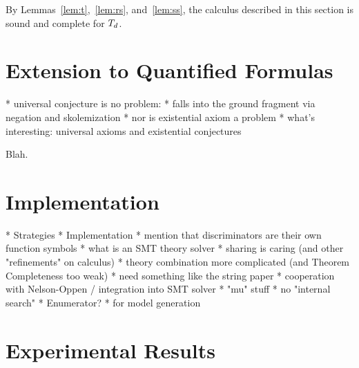 By Lemmas~\ref{lem:t},~\ref{lem:rs}, and~\ref{lem:ss}, the calculus described in this section is sound and complete for $T_{d}$.

\section{Extension to Quantified Formulas}
\label{sec:extension-to-quantified-formulas}

  * universal conjecture is no problem:
    * falls into the ground fragment via negation
      and skolemization
  * nor is existential axiom a problem
  * what's interesting: universal axioms and existential conjectures

Blah.

\section{Implementation}
\label{sec:the-theory-solver}

  * Strategies
  * Implementation
    * mention that discriminators are their own function symbols
    * what is an SMT theory solver
    * sharing is caring (and other "refinements" on calculus)
    * theory combination more complicated (and Theorem Completeness too weak)
      * need something like the string paper
    * cooperation with Nelson-Oppen / integration into SMT solver
    * "mu" stuff
    * no "internal search"
  * Enumerator?
    * for model generation


\section{Experimental Results}
\label{sec:experimental-results}

\newcommand\landg{L\,\&\,G}
\newcommand\HD[1]{\hbox to2.5em{\hfill#1\hfill}}

